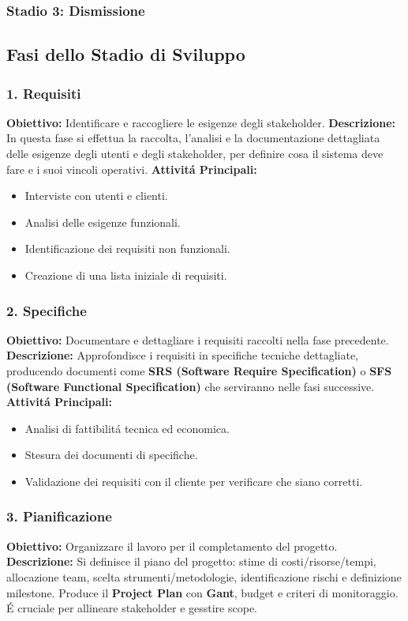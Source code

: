 \documentclass[11pt]{article}
\begin{document}
\subsubsection{Stadio 3: Dismissione}
\label{sec:org128a6b5}
\subsection{Fasi dello Stadio di Sviluppo}
\label{sec:org9b94dce}
\subsubsection{1. Requisiti}
\label{sec:orgd64dae2}
\textbf{\textbf{Obiettivo:}} Identificare e raccogliere le esigenze degli stakeholder.
\textbf{\textbf{Descrizione:}} In questa fase si effettua la raccolta, l'analisi e la documentazione dettagliata delle esigenze degli utenti e degli stakeholder, per definire cosa il sistema deve fare e i suoi vincoli operativi.
\textbf{\textbf{Attivitá Principali:}}
\begin{itemize}
\item Interviste con utenti e clienti.
\item Analisi delle esigenze funzionali.
\item Identificazione dei requisiti non funzionali.
\item Creazione di una lista iniziale di requisiti.
\end{itemize}
\subsubsection{2. Specifiche}
\label{sec:org5fe2f85}
\textbf{\textbf{Obiettivo:}} Documentare e dettagliare i requisiti raccolti nella fase precedente.
\textbf{\textbf{Descrizione:}} Approfondisce i requisiti in specifiche tecniche dettagliate, producendo documenti come \textbf{\textbf{SRS (Software Require Specification)}} o \textbf{\textbf{SFS (Software Functional Specification)}} che serviranno nelle fasi successive.
\textbf{\textbf{Attivitá Principali:}}
\begin{itemize}
\item Analisi di fattibilitá tecnica ed economica.
\item Stesura dei documenti di specifiche.
\item Validazione dei requisiti con il cliente per verificare che siano corretti.
\end{itemize}
\subsubsection{3. Pianificazione}
\label{sec:orga4477a4}
\textbf{\textbf{Obiettivo:}} Organizzare il lavoro per il completamento del progetto.
\textbf{\textbf{Descrizione:}} Si definisce il piano del progetto: stime di costi/risorse/tempi, allocazione team, scelta strumenti/metodologie, identificazione rischi e definizione milestone. Produce il \textbf{\textbf{Project Plan}} con \textbf{Gant}, budget e criteri di monitoraggio. É cruciale per allineare stakeholder e gesstire scope.
\end{document}
